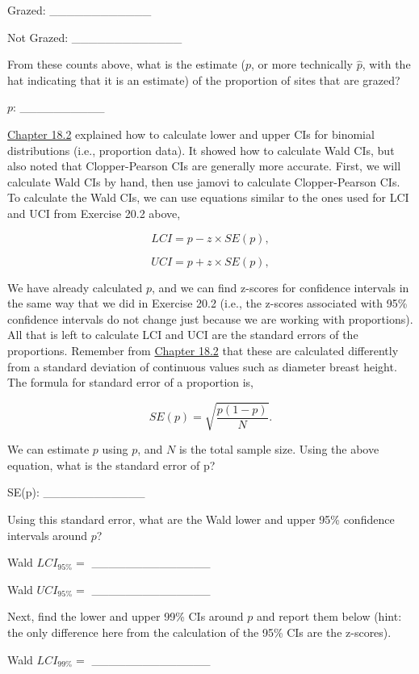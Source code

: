 \documentclass[
]{scrbook}
\begin{document}
Grazed: \_\_\_\_\_\_\_\_\_\_\_\_

Not Grazed: \_\_\_\_\_\_\_\_\_\_\_\_\_

From these counts above, what is the estimate (\(p\), or more technically \(\hat{p}\), with the hat indicating that it is an estimate) of the proportion of sites that are grazed?

\(p\): \_\_\_\_\_\_\_\_\_\_

\href{Chapter_18.html\#binomial-distribution-cis}{Chapter 18.2} explained how to calculate lower and upper CIs for binomial distributions (i.e., proportion data).
It showed how to calculate Wald CIs, but also noted that Clopper-Pearson CIs are generally more accurate.
First, we will calculate Wald CIs by hand, then use jamovi to calculate Clopper-Pearson CIs.
To calculate the Wald CIs, we can use equations similar to the ones used for LCI and UCI from Exercise 20.2 above,

\[LCI = p - z \times SE(p),\]

\[UCI = p + z \times SE(p),\]

We have already calculated \(p\), and we can find z-scores for confidence intervals in the same way that we did in Exercise 20.2 (i.e., the z-scores associated with 95\% confidence intervals do not change just because we are working with proportions).
All that is left to calculate LCI and UCI are the standard errors of the proportions.
Remember from \href{Chapter_18.html\#binomial-distribution-cis}{Chapter 18.2} that these are calculated differently from a standard deviation of continuous values such as diameter breast height.
The formula for standard error of a proportion is,

\[SE(p) = \sqrt{\frac{p\left(1 - p\right)}{N}}.\]

We can estimate \(p\) using \(p\), and \(N\) is the total sample size.
Using the above equation, what is the standard error of p?

SE(p): \_\_\_\_\_\_\_\_\_\_\_\_

Using this standard error, what are the Wald lower and upper 95\% confidence intervals around \(p\)?

Wald \(LCI_{95\%} =\) \_\_\_\_\_\_\_\_\_\_\_\_\_\_

Wald \(UCI_{95\%} =\) \_\_\_\_\_\_\_\_\_\_\_\_\_\_

Next, find the lower and upper 99\% CIs around \(p\) and report them below (hint: the only difference here from the calculation of the 95\% CIs are the z-scores).

Wald \(LCI_{99\%} =\) \_\_\_\_\_\_\_\_\_\_\_\_\_\_
\end{document}
